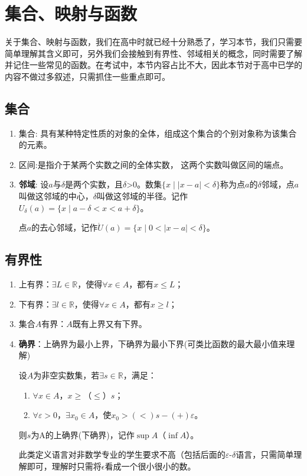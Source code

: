 \chapter{集合、映射与函数}

关于集合、映射与函数，我们在高中时就已经十分熟悉了，学习本节，我们只需要简单理解其含义即可，另外我们会接触到有界性、邻域相关的概念，同时需要了解并记住一些常见的函数。在考试中，本节内容占比不大，因此本节对于高中已学的内容不做过多叙述，只需抓住一些重点即可。

\section{集合}
\begin{enumerate}
	\item 集合: 具有某种特定性质的对象的全体，组成这个集合的个别对象称为该集合的元素。
	\item 区间:是指介于某两个实数之间的全体实数， 这两个实数叫做区间的端点。
	\item \textbf{邻域}: 设$a$与$\delta$是两个实数，且$\delta$>0。数集$\{x \mid |x-a|<\delta\}$称为点$a$的$\delta$邻域，点$a$叫做这邻域的中心，$\delta$叫做这邻域的半径。记作$U_\delta(a)=\{x\mid a-\delta<x<a+\delta\}$。

	点$a$的去心邻域，记作$\mathring{U}(a)=\{x \mid 0<|x-a|< \delta \}$。
\end{enumerate}

\section{有界性}
\begin{enumerate}
	\item 上有界：$\exists L \in \mathbb{R}$，使得$\forall x \in A$，都有$x\leq L$；

	\item 下有界：$\exists l \in \mathbb{R}$，使得$\forall x \in A$，都有$x \geq l$；
	
	\item 集合$A$有界：$A$既有上界又有下界。
	
	\item \textbf{确界}：上确界为最小上界，下确界为最小下界(可类比函数的最大最小值来理解)
	
	设$A$为非空实数集，若$\exists s \in \mathbb{R}$，满足：
	\begin{enumerate}
		\item $\forall x \in A$，$x \geqslant $（$\leqslant$）$s$；
		\item $\forall \varepsilon > 0$，$\exists x_0 \in A$，使$x_0 >(<) s -(+) \varepsilon$。
	\end{enumerate}
	则$s$为A的上确界(下确界)，记作$\sup A$（$\inf A$）。
	\begin{remark}
		此类定义语言对非数学专业的学生要求不高（包括后面的$\varepsilon$-$\delta$语言，只需简单理解即可，理解时只需将$\epsilon$看成一个很小很小的数。
	\end{remark}
\end{enumerate}

